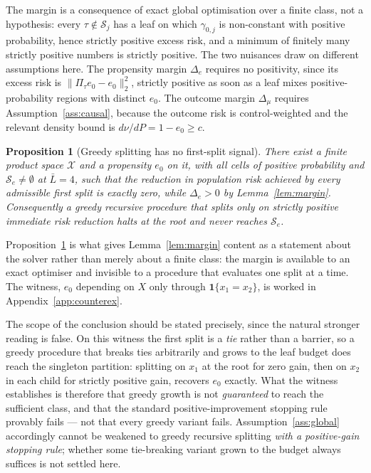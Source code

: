 \documentclass[11pt]{article}
\theoremstyle{plain}
\newtheorem{proposition}[theorem]{Proposition}
\theoremstyle{definition}
\theoremstyle{remark}
\newcommand{\cX}{\mathcal{X}}
\newcommand{\cS}{\mathcal{S}}
\newcommand{\ez}{e_0}
\newcommand{\Ltwo}[1]{\lVert #1 \rVert_{2}}
\begin{document}
The margin is a consequence of exact global optimisation over a finite class,
not a hypothesis: every $\tau\notin\cS_j$ has a leaf on which $\gamma_{0,j}$ is
non-constant with positive probability, hence strictly positive excess risk, and
a minimum of finitely many strictly positive numbers is strictly positive. The
two nuisances draw on different assumptions here. The propensity margin
$\Delta_e$ requires no positivity, since its excess risk is
$\Ltwo{\Pi_\tau\ez-\ez}^2$, strictly positive as soon as a leaf mixes
positive-probability regions with distinct $\ez$. The outcome margin $\Delta_\mu$
requires Assumption~\ref{ass:causal}, because the outcome risk is
control-weighted and the relevant density bound is $d\nu/dP=1-\ez\ge c$.

\begin{proposition}[Greedy splitting has no first-split signal]\label{prop:greedy}
There exist a finite product space $\cX$ and a propensity $\ez$ on it, with all
cells of positive probability and $\cS_e\ne\emptyset$ at $\bar L=4$, such that the
reduction in population risk achieved by every admissible first split is exactly
zero, while $\Delta_e>0$ by Lemma~\ref{lem:margin}. Consequently a greedy
recursive procedure that splits only on strictly positive immediate risk
reduction halts at the root and never reaches $\cS_e$.
\end{proposition}

\noindent Proposition~\ref{prop:greedy} is what gives Lemma~\ref{lem:margin}
content as a statement about the solver rather than merely about a finite class:
the margin is available to an exact optimiser and invisible to a procedure that
evaluates one split at a time. The witness, $\ez$ depending on $X$ only through
$\mathbf1\{x_1=x_2\}$, is worked in Appendix~\ref{app:counterex}.

The scope of the conclusion should be stated precisely, since the natural
stronger reading is false. On this witness the first split is a \emph{tie} rather
than a barrier, so a greedy procedure that breaks ties arbitrarily and grows to
the leaf budget does reach the singleton partition: splitting on $x_1$ at the root
for zero gain, then on $x_2$ in each child for strictly positive gain, recovers
$\ez$ exactly. What the witness establishes is therefore that greedy growth is not
\emph{guaranteed} to reach the sufficient class, and that the standard
positive-improvement stopping rule provably fails --- not that every greedy
variant fails. Assumption~\ref{ass:global} accordingly cannot be weakened to
greedy recursive splitting \emph{with a positive-gain stopping rule}; whether some
tie-breaking variant grown to the budget always suffices is not settled here.
\end{document}
